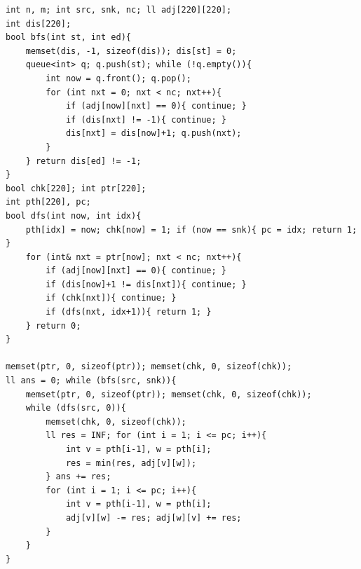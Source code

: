 \begin{verbatim}
int n, m; int src, snk, nc; ll adj[220][220];
int dis[220];
bool bfs(int st, int ed){
	memset(dis, -1, sizeof(dis)); dis[st] = 0;
	queue<int> q; q.push(st); while (!q.empty()){
		int now = q.front(); q.pop();
		for (int nxt = 0; nxt < nc; nxt++){
			if (adj[now][nxt] == 0){ continue; }
			if (dis[nxt] != -1){ continue; }
			dis[nxt] = dis[now]+1; q.push(nxt);
		}
	} return dis[ed] != -1;
}
bool chk[220]; int ptr[220];
int pth[220], pc;
bool dfs(int now, int idx){
	pth[idx] = now; chk[now] = 1; if (now == snk){ pc = idx; return 1; }
	for (int& nxt = ptr[now]; nxt < nc; nxt++){
		if (adj[now][nxt] == 0){ continue; }
		if (dis[now]+1 != dis[nxt]){ continue; }
		if (chk[nxt]){ continue; }
		if (dfs(nxt, idx+1)){ return 1; }
	} return 0;
}

memset(ptr, 0, sizeof(ptr)); memset(chk, 0, sizeof(chk));
ll ans = 0; while (bfs(src, snk)){
	memset(ptr, 0, sizeof(ptr)); memset(chk, 0, sizeof(chk));
	while (dfs(src, 0)){
		memset(chk, 0, sizeof(chk));
		ll res = INF; for (int i = 1; i <= pc; i++){
			int v = pth[i-1], w = pth[i];
			res = min(res, adj[v][w]);
		} ans += res;
		for (int i = 1; i <= pc; i++){
			int v = pth[i-1], w = pth[i];
			adj[v][w] -= res; adj[w][v] += res;
		}
	}
}
\end{verbatim}